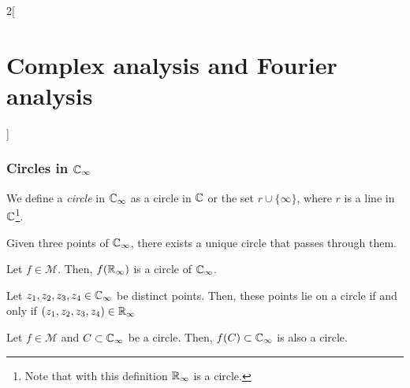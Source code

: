 \documentclass[../../../main.tex]{subfiles}
\begin{document}
\begin{multicols}{2}[\section{Complex analysis and Fourier analysis}]
  \subsubsection{Circles in \texorpdfstring{$\mathbb{C}_\infty$}{Coo}}
  \begin{definition}
    We define a \emph{circle} in $\mathbb{C}_\infty$ as a circle in $\mathbb{C}$ or the set $r\cup\{\infty\}$, where $r$ is a line in $\mathbb{C}$\footnote{Note that with this definition $\mathbb{R}_\infty$ is a circle.}.
  \end{definition}
  \begin{proposition}
    Given three points of $\mathbb{C}_\infty$, there exists a unique circle that passes through them.
  \end{proposition}
  \begin{proposition}
    Let $f\in\mathcal{M}$. Then, $f(\mathbb{R}_\infty)$ is a circle of $\mathbb{C}_\infty$.
  \end{proposition}
  \begin{proposition}
    Let $z_1,z_2,z_3,z_4\in\mathbb{C}_\infty$ be distinct points. Then, these points lie on a circle if and only if $(z_1,z_2,z_3,z_4)\in\mathbb{R}_\infty$
  \end{proposition}
  \begin{theorem}
    Let $f\in\mathcal{M}$ and $C\subset\mathbb{C}_\infty$ be a circle. Then, $f(C)\subset\mathbb{C}_\infty$ is also a circle.
  \end{theorem}

\end{multicols}
\end{document}
